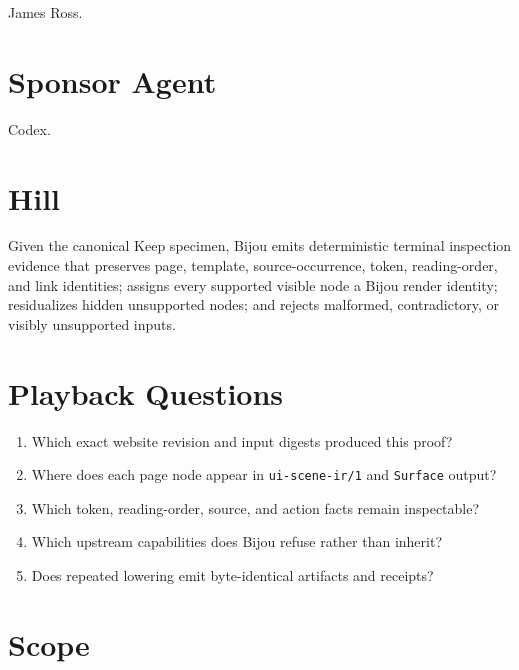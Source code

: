 James Ross.

\section{Sponsor Agent}\label{record-146-sponsor-agent}

Codex.

\section{Hill}\label{record-146-hill}

Given the canonical Keep specimen, Bijou emits deterministic terminal inspection evidence that preserves page, template, source-occurrence, token, reading-order, and link identities; assigns every supported visible node a Bijou render identity; residualizes hidden unsupported nodes; and rejects malformed, contradictory, or visibly unsupported inputs.

\section{Playback Questions}\label{record-146-playback-questions}

\begin{enumerate}
\def\labelenumi{\arabic{enumi}.}
\tightlist
\item
  Which exact website revision and input digests produced this proof?
\item
  Where does each page node appear in \texttt{u\allowbreak{}i\allowbreak{}-\allowbreak{}s\allowbreak{}c\allowbreak{}e\allowbreak{}n\allowbreak{}e\allowbreak{}-\allowbreak{}i\allowbreak{}r\allowbreak{}/\allowbreak{}1} and \texttt{S\allowbreak{}u\allowbreak{}r\allowbreak{}f\allowbreak{}a\allowbreak{}c\allowbreak{}e} output?
\item
  Which token, reading-order, source, and action facts remain inspectable?
\item
  Which upstream capabilities does Bijou refuse rather than inherit?
\item
  Does repeated lowering emit byte-identical artifacts and receipts?
\end{enumerate}

\section{Scope}\label{record-146-scope}

